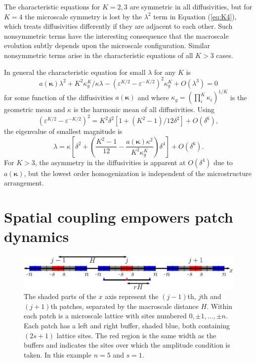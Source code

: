 \documentclass[12pt,a4paper]{article}
\begin{document}
The characteristic equations for $K=2,3$ are symmetric in all diffusivities, but for $K=4$ the microscale symmetry is lost by the $\lambda^2$ term in Equation (\ref{eq:K4}), which treats diffusivities differently if they are adjacent to each other.
Such nonsymmetric terms have the interesting consequence that the macroscale evolution subtly depends upon the microscale configuration. Similar nonsymmetric terms arise in the characteristic equations of all $K>3$ cases.

In general the characteristic equation for small $\lambda$ for any $K$ is
\begin{equation}
a({\bm \kappa})\lambda^2+K^2\kappa_g^K/\kappa\lambda-(\varepsilon^{K/2}-\varepsilon^{-K/2})^2\kappa_g^K+O(\lambda^3)=0
\end{equation}
for some function of the diffusivities $a({\bm \kappa})$ and where $\kappa_g=(\prod_i^K\kappa_i)^{1/K}$ is the geometric mean and $\kappa$ is the harmonic mean of all diffusivities. 
Using
\begin{equation}
(\varepsilon^{K/2}-\varepsilon^{-K/2})^2=K^2\delta^2[1+(K^2-1)/12\delta^2]+O(\delta^6),
\end{equation}
the eigenvalue of smallest magnitude is
\begin{equation}
\lambda=\kappa\left[\delta^2+\left(\frac{K^2-1}{12}-\frac{a({\bm \kappa})\kappa^2}{K^2\kappa_g^K}\right)\delta^4\right]+O(\delta^6).\label{eq:glargek}
\end{equation}
For $K>3$, the asymmetry in the diffusivities is apparent at $O(\delta^4)$ due to $a({\bm \kappa})$, but the lowest order homogenization is independent of the microstructure arrangement.

\section{Spatial coupling empowers patch dynamics}
\label{sec:numerical}


\begin{figure}
\begin{center}
\includegraphics[width=13cm]{1dBC}
\caption{The shaded parts of the $x$ axis represent the $(j-1)$th, $j$th and $(j+1)$th patches, separated by the macroscale distance $H$. Within each patch is a microscale lattice with sites numbered $0,\pm1,\ldots,\pm n$. Each patch has a left and right buffer, shaded blue, both containing $(2s+1)$ lattice sites. The red region is the same width as the buffers and indicates the sites over which the amplitude condition is taken. In this example $n=5$ and $s=1$.}
\label{fig:1dBC}
\end{center}
\end{figure}
\end{document}
